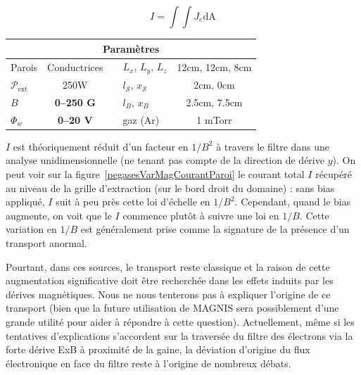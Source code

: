\begin{refsection}
\begin{equation}
I=\int\int J_e\text{dA}
\end{equation}
\begin{minipage}{\textwidth}
\footnotesize\centering
{}
\begin{tabular}{lcclc}\toprule
\multicolumn{5}{c}{\bf Paramètres}\\
\midrule 
Parois & Conductrices &&$L_x$, $L_y$, $L_z$  & 12cm, 12cm,
8cm\\
$\mathcal{P}_\text{ext}$&250W&&$l_\mathcal{S}$, $x_\mathcal{S}$&2cm, 0cm\\
$B$&\textbf{0--250 G}&&$l_B$, $x_B$&2.5cm, 7.5cm\\
$\Phi_w$ & \textbf{0--20 V}&&gaz (Ar) & 1 mTorr\\
\bottomrule
\end{tabular}
\label{4-PegasesScanPreParam}
\end{minipage}

$I$ est théoriquement réduit d'un facteur en $1/B^2$ à travers le filtre dans
une analyse unidimensionnelle (ne tenant pas compte de la direction de dérive
$y$). On peut voir sur la figure~\ref{pegasesVarMagCourantParoi} le courant
total $I$ récupéré au niveau de la grille d'extraction (sur le bord droit du
domaine) : sans bias appliqué, $I$ suit à peu près cette loi d'échelle en
$1/B^2$. Cependant, quand le bias augmente, on voit que le $I$ commence plutôt à suivre une loi en
$1/B$. Cette variation en $1/B$ est généralement prise comme la signature de la
présence d'un transport anormal.

Pourtant, dans ces sources, le transport reste classique et la raison de cette
augmentation significative doit être recherchée dans les effets induits par les
dérives  magnétiques. Nous ne nous tenterons pas à
expliquer l'origine de ce transport (bien que la future utilisation de MAGNIS
sera possiblement d'une grande utilité pour aider à répondre à cette question).
Actuellement, même si les tentatives d'explications s'accordent sur la
traversée du filtre des électrons via la forte dérive ExB à proximité de la
gaine, la déviation d'origine du flux électronique en face du filtre reste à
l'origine de nombreux débats.


\end{refsection}
